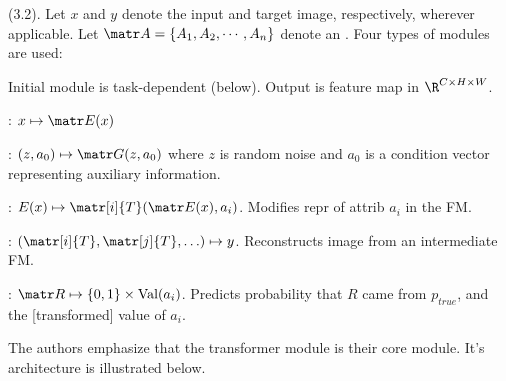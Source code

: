 \documentclass[11pt]{article}
\begin{document}
 (3.2). Let $x$ and $y$ denote the input and target image, respectively, wherever applicable. Let $\matr A = \{A_1, A_2, \cdots, A_n\}$ denote an . Four types of modules are used:
\begin{compactenum}
	\item Initial module is task-dependent (below). Output is feature map in $\R^{C \times H \times W}$. 
	\begin{compactitem}
		\item \purple{[translation]} : $x \mapsto \matr E(x)$
		\item \purple{[generation]} : $(z, a_0) \mapsto \matr G(z, a_0) $ where $z$ is random noise and $a_0$ is a condition vector representing auxiliary information. 
	\end{compactitem}
	
	\item \underline{} : $E(x) \mapsto \matr[i]{T}(\matr E(x), a_i)$. Modifies repr of attrib $a_i$ in the FM.
	\item {} : $(\matr[i]{T}, \matr[j]{T}, \ldots) \mapsto y$. Reconstructs image from an intermediate FM. 
	\item {}: $\matr R \mapsto \{0, 1\} \times \text{Val}(a_i)$. Predicts probability that $R$ came from $p_{true}$, and the [transformed] value of $a_i$. 
\end{compactenum}
The authors emphasize that the transformer module is their core module. It's architecture is illustrated below. 

\end{document}
